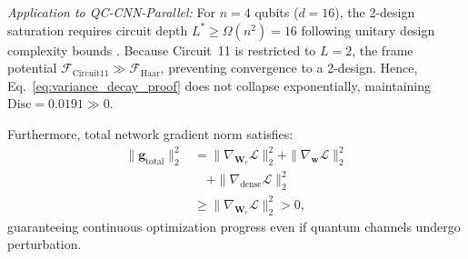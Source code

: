 \documentclass[journal]{IEEEtran}
\begin{document}
\textit{Application to QC-CNN-Parallel:} For $n=4$ qubits ($d=16$), the 2-design saturation requires circuit depth $L^* \ge \Omega(n^2) = 16$ following unitary design complexity bounds \cite{haferkamp2022linear}. Because Circuit~11 is restricted to $L=2$, the frame potential $\mathcal{F}_{\mathrm{Circuit11}} \gg \mathcal{F}_{\mathrm{Haar}}$, preventing convergence to a 2-design. Hence, Eq.~\eqref{eq:variance_decay_proof} does not collapse exponentially, maintaining $\mathrm{Disc} = 0.0191 \gg 0$.

Furthermore, total network gradient norm satisfies:
\begin{align}
\|\mathbf{g}_{\mathrm{total}}\|_2^2 &= \|\nabla_{\mathbf{W}_c} \mathcal{L}\|_2^2 + \|\nabla_{\mathbf{w}} \mathcal{L}\|_2^2 \nonumber \\
&\quad + \|\nabla_{\mathrm{dense}} \mathcal{L}\|_2^2 \nonumber \\
&\ge \|\nabla_{\mathbf{W}_c} \mathcal{L}\|_2^2 > 0,
\label{eq:total_gradient_lower_bound}
\end{align}
guaranteeing continuous optimization progress even if quantum channels undergo perturbation.
\end{document}
